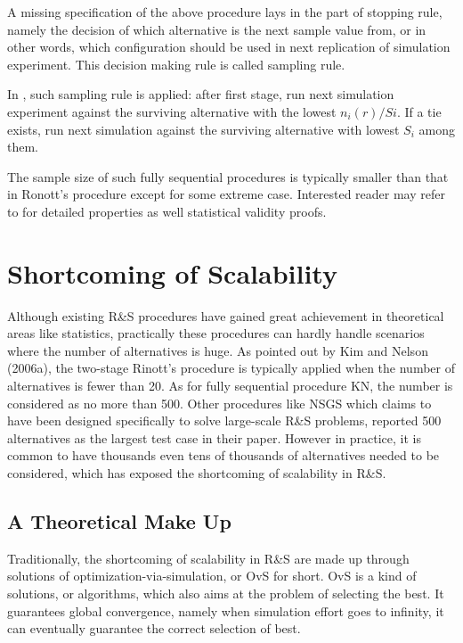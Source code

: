 \documentclass[12pt,a4]{report}
\begin{document}
A missing specification of the above procedure lays in the part of stopping rule, namely the decision of which alternative is the next sample value from, or in other words, which configuration should be used in next replication of simulation experiment. This decision making rule is called sampling rule.

In \cite{ras-seq-jeff}, such sampling rule is applied: after first stage, run next simulation experiment against the surviving alternative with the lowest $n_i(r)/Si$. If a tie exists, run next simulation against the surviving alternative with lowest $S_i$ among them.

The sample size of such fully sequential procedures is typically smaller than that in Ronott's procedure except for some extreme case. Interested reader may refer to \cite{ras-seq-jeff} for detailed properties as well statistical validity proofs.

\section{Shortcoming of Scalability}

Although existing R\&S procedures have gained great achievement in theoretical areas like statistics, practically these procedures can hardly handle scenarios where the number of alternatives is huge. As pointed out by Kim and Nelson (2006a), the two-stage Rinott’s procedure is typically applied when the number of alternatives is fewer than 20. As for fully sequential procedure KN, the number is considered as no more than 500. Other procedures like NSGS which claims to have been designed specifically to solve large-scale R\&S problems, reported 500 alternatives as the largest test case in their paper. However in practice, it is common to have thousands even tens of thousands of alternatives needed to be considered, which has exposed the shortcoming of scalability in R\&S.

\subsection{A Theoretical Make Up}

Traditionally, the shortcoming of scalability in R\&S are made up through solutions of optimization-via-simulation, or OvS for short. OvS is a kind of solutions, or algorithms, which also aims at the problem of selecting the best. It guarantees global convergence, namely when simulation effort goes to infinity, it can eventually guarantee the correct selection of best.
\end{document}
